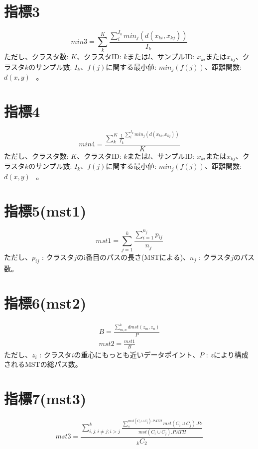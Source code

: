﻿\documentclass{article}
\begin{document}
\section{指標3}
\begin{equation}
min3={\sum_{k}^{K}{\frac{\sum_{i}^{I_k}{min_j(d(x_{ki},x_{kj}))}}{I_k}}}
\end{equation}
ただし、クラスタ数: $K$、クラスタID: $k$または$l$、サンプルID: $x_{ki}$または$x_{kj}$、クラスタ$k$のサンプル数: $I_k$、$f(j)$に関する最小値: $min_j(f(j))$、距離関数:$d(x,y)$  \ 。

\section{指標4}
\begin{equation}
min4={\frac{\sum_{k}^{K}{{\frac{1}{I_k}}^{\sum_{i}^{I_k}{min_j(d(x_{ki},x_{kj}))}}}}{K}}
\end{equation}
ただし、クラスタ数: $K$、クラスタID: $k$または$l$、サンプルID: $x_{ki}$または$x_{kj}$、クラスタ$k$のサンプル数: $I_k$、$f(j)$に関する最小値: $min_j(f(j))$、距離関数:$d(x,y)$  \ 。

\section{指標5(mst1)}
\begin{equation}
mst1 = { \sum_{j=1}^{k}{ \frac{\sum_{i=1}^{n_j}{p_{ij}}}{n_j} } }
\end{equation}
ただし、$p_{ij}$ : クラスタ$j$のi番目のパスの長さ(MSTによる)、$n_j$ : クラスタ$j$のパス数。

\section{指標6(mst2)}
\begin{eqnarray}
B = { \frac{\sum_{m,n}^{k}{dmst(z_m,z_n)}}{P} } \\
mst2 = { \frac{mst1}{B} }
\end{eqnarray}
ただし、$z_i$ : クラスタ$i$の重心にもっとも近いデータポイント、$P$ : $z$により構成されるMSTの総パス数。

\section{指標7(mst3)}
\begin{equation}
mst3 = { \frac{ \sum_{i,j;i\neq{}j;i>j}^{k}{ \frac{ \sum_{s}^{mst(C_i\cup{}C_j).PATH}{ mst(C_i\cup{}C_j).Ps } }{mst(C_i\cup{}C_j).PATH} } }{ {}_{k}C_2 } }
\end{equation}
\end{document}
